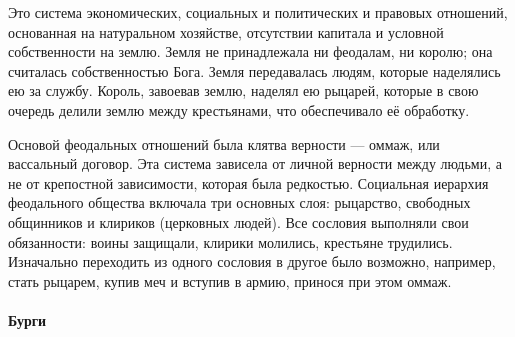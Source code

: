 Это система экономических, социальных и политических и правовых отношений, основанная на натуральном хозяйстве, отсутствии капитала и условной собственности на землю. Земля не принадлежала ни феодалам, ни королю; она считалась собственностью Бога. Земля передавалась людям, которые наделялись ею за службу. Король, завоевав землю, наделял ею рыцарей, которые в свою очередь делили землю между крестьянами, что обеспечивало её обработку.

Основой феодальных отношений была клятва верности — оммаж, или вассальный договор. Эта система зависела от личной верности между людьми, а не от крепостной зависимости, которая была редкостью. Социальная иерархия феодального общества включала три основных слоя: рыцарство, свободных общинников и клириков (церковных людей). Все сословия выполняли свои обязанности: воины защищали, клирики молились, крестьяне трудились. Изначально переходить из одного сословия в другое было возможно, например, стать рыцарем, купив меч и вступив в армию, принося при этом оммаж.

\paragraph{Бурги} 

